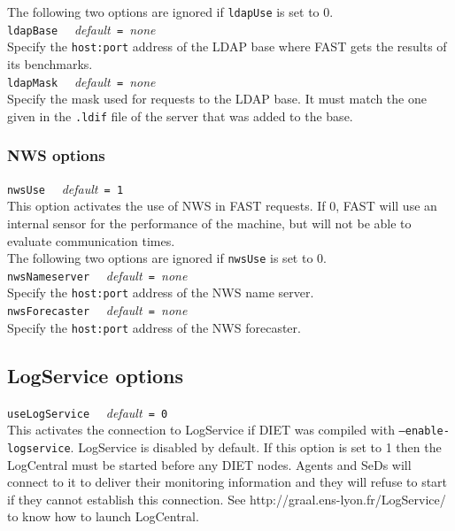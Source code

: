 The following two options are ignored if \texttt{ldapUse} is set to 0.
\\

\noindent
\texttt{ldapBase} \ \ \emph{default}\texttt{ = }\emph{none}\\
Specify the \texttt{host:port} address of the LDAP base where FAST gets the
results of its benchmarks.
\\

\noindent
\texttt{ldapMask} \ \ \emph{default}\texttt{ = }\emph{none}\\
Specify the mask used for requests to the LDAP base. It must match the one given
in the \texttt{.ldif} file of the server that was added to the base.


\subsubsection{NWS options}

\noindent
\texttt{nwsUse} \ \ \emph{default}\texttt{ = 1}\\
This option activates the use of NWS in FAST requests. If 0, FAST will use an
internal sensor for the performance of the machine, but will not be able to
evaluate communication times.
\\

The following two options are ignored if \texttt{nwsUse} is set to 0.
\\

\noindent
\texttt{nwsNameserver} \ \ \emph{default}\texttt{ = }\emph{none}\\
Specify the \texttt{host:port} address of the NWS name server.
\\

\noindent
\texttt{nwsForecaster} \ \ \emph{default}\texttt{ = }\emph{none}\\
Specify the \texttt{host:port} address of the NWS forecaster.
\\


\subsection{LogService options}

\noindent
\texttt{useLogService} \ \ \emph{default}\texttt{ = 0}\\
This activates the connection to LogService if DIET was compiled with
\texttt{--enable-logservice}. LogService is disabled by default.
If this option is set to 1 then the LogCentral must be started
before any DIET nodes. Agents and SeDs will connect to it to
deliver their monitoring information and they will refuse to
start if they cannot establish this connection. See http://graal.ens-lyon.fr/LogService/
to know how to launch LogCentral.
\\

